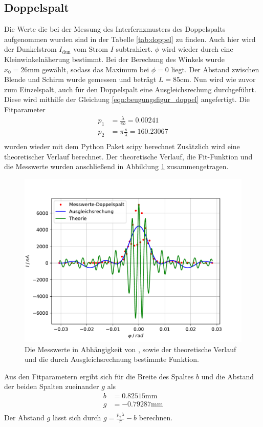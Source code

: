 \subsection{Doppelspalt}
Die Werte die bei der Messung des Interfernzmusters des Doppelspalts aufgenommen wurden sind in der Tabelle \ref{tab:doppel} zu finden.
Auch hier wird der Dunkelstrom $I_\text{dun}$ vom Strom $I$ subtrahiert.
$\phi$ wird wieder durch eine Kleinwinkelnäherung bestimmt.
Bei der Berechung des Winkels wurde $x_0 = 26 \si{\milli\meter}$ gewählt, sodass das Maximum bei $\phi = 0$ liegt.
Der Abstand zwischen Blende und Schirm wurde gemessen und beträgt $L = 85 \si{\centi\meter}$.
Nun wird wie zuvor zum Einzelspalt, auch für den Doppelspalt eine Ausgleichsrechung durchgeführt.
Diese wird mithilfe der Gleichung \ref{eqn:beugungsfigur_doppel} angefertigt.
Die Fitparameter
\begin{align*}
p_1 &= \frac{\lambda}{\pi b} = 0.00241\\
p_2 &= \pi \frac{s}{\lambda} = 160.23067 \\
\end{align*}
wurden wieder mit dem Python Paket scipy berechnet
Zusätzlich wird eine theoretischer Verlauf berechnet.
Der theoretische Verlauf, die Fit-Funktion und die Messwerte wurden anschließend in Abbildung \ref{fig:doppel} zusammengetragen.
\begin{figure}
    \centering
    \includegraphics[width=\textwidth]{content/data/doppelspalt.pdf}
    \caption{Die Messwerte in Abhängigkeit von \phi, sowie der theoretische Verlauf und die durch Ausgleichsrechnung bestimmte Funktion.}
    \label{fig:doppel}
\end{figure}
Aus den Fitparametern ergibt sich für die Breite des Spaltes $b$ und die Abstand der beiden Spalten zueinander $g$ als
\begin{align*}
    b &= 0.82515\si{\milli\meter}\\
    g &= -0.79287 \si{\milli\meter} \\
\end{align*}
Der Abstand $g$ lässt sich durch $g = \frac{p_2\lambda}{\pi} -b$ berechnen.

